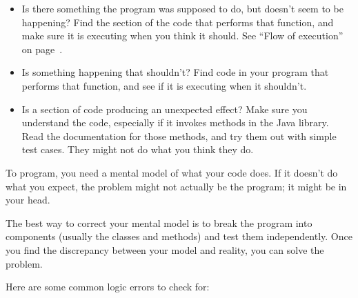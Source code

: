 \documentclass[12pt]{book}
\theoremstyle{exercise}
\begin{document}
\begin{itemize}

\item Is there something the program was supposed to do, but doesn't seem to be happening?
Find the section of the code that performs that function, and make sure it is executing when you think it should.
See ``Flow of execution'' on page~\pageref{flowexec}.

\item Is something happening that shouldn't?
Find code in your program that performs that function, and see if it is executing when it shouldn't.

\item Is a section of code producing an unexpected effect?
Make sure you understand the code, especially if it invokes methods in the Java library.
Read the documentation for those methods, and try them out with simple test cases.
They might not do what you think they do.

\end{itemize}

To program, you need a mental model of what your code does.
If it doesn't do what you expect, the problem might not actually be the program; it might be in your head.


The best way to correct your mental model is to break the program into components (usually the classes and methods) and test them independently.
Once you find the discrepancy between your model and reality, you can solve the problem.

Here are some common logic errors to check for:

\end{document}

